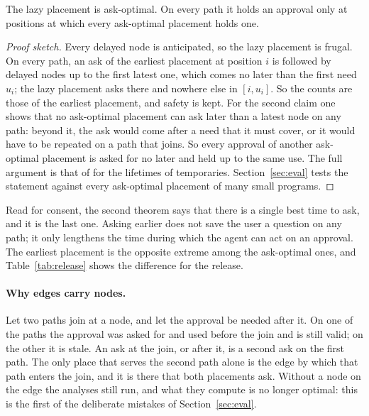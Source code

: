 \documentclass[acmsmall,nonacm,screen]{acmart}
\begin{document}
\begin{theorem}
\label{thm:lazy}
The lazy placement is ask-optimal. On every path it holds an approval only at positions at
which every ask-optimal placement holds one.
\end{theorem}

\begin{proof}[Proof sketch]
Every delayed node is anticipated, so the lazy placement is frugal. On every path, an ask
of the earliest placement at position $i$ is followed by delayed nodes up to the first
latest one, which comes no later than the first need $u_i$; the lazy placement asks there
and nowhere else in $[i, u_i]$. So the counts are those of the earliest placement, and
safety is kept. For the second claim one shows that no ask-optimal placement can ask later
than a latest node on any path: beyond it, the ask would come after a need that it must
cover, or it would have to be repeated on a path that joins. So every approval of another
ask-optimal placement is asked for no later and held up to the same use. The full argument
is that of \citet{knoop1994} for the lifetimes of temporaries. Section~\ref{sec:eval} tests
the statement against every ask-optimal placement of many small programs.
\end{proof}

Read for consent, the second theorem says that there is a single best time to ask, and it
is the last one. Asking earlier does not save the user a question on any path; it only
lengthens the time during which the agent can act on an approval. The earliest placement
is the opposite extreme among the ask-optimal ones, and Table~\ref{tab:release} shows the
difference for the release.

\paragraph{Why edges carry nodes.} Let two paths join at a node, and let the approval be
needed after it. On one of the paths the approval was asked for and used before the join and
is still valid; on the other it is stale. An ask at the join, or after it, is a second ask
on the first path. The only place that serves the second path alone is the edge by which
that path enters the join, and it is there that both placements ask. Without a node on the
edge the analyses still run, and what they compute is no longer optimal: this is the first
of the deliberate mistakes of Section~\ref{sec:eval}.
\end{document}
